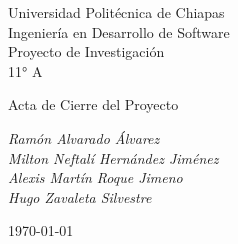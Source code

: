 \begin{center}
{\Large Universidad Politécnica de Chiapas}\\
Ingeniería en Desarrollo de Software\\
Proyecto de Investigación\\
11° A\\

\vfill

{\Huge Acta de Cierre del Proyecto}

\vspace{0.5cm}
{\Large \textsl{Ramón Alvarado Álvarez\\}}
{\Large \textsl{Milton Neftalí Hernández Jiménez\\}}
{\Large \textsl{Alexis Martín Roque Jimeno\\}}
{\Large \textsl{Hugo Zavaleta Silvestre\\}}


\vfill
\today
\end{center}